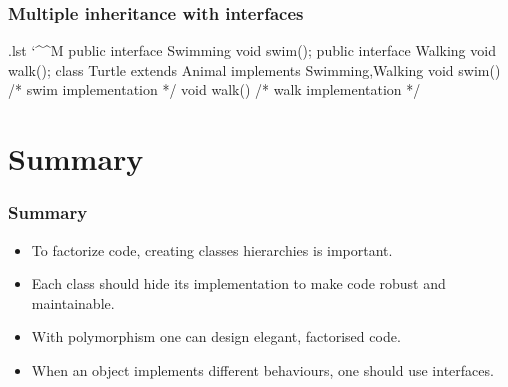 \documentclass[10pt,handout]{beamer}
\makeatletter
\newenvironment{code}{%
  \begingroup
  \@bsphack
  \immediate\openout\lstvrb@out\jobname.lst
  \let\do\@makeother\dospecials\catcode`\^^M\active
  \def\verbatim@processline{%
    \immediate\write\lstvrb@out{\the\verbatim@line}}%
  \verbatim@start}{%
  \immediate\closeout\lstvrb@out
  \@esphack
  \endgroup
  
  \begin{alertblock}{}
    
  \end{alertblock}}
\makeatother
\begin{document}
\begin{frame}[fragile]
  \frametitle{Multiple inheritance with interfaces}
  \begin{center}
  \end{center}
\end{frame}

\begin{frame}[fragile]
  \begin{code}
  public interface Swimming {
    void swim();
  }
  public interface Walking {
    void walk();
  }
  class Turtle extends Animal 
               implements Swimming,Walking{
    void swim() { /* swim implementation */}
    void walk() { /* walk implementation */}
  }
  \end{code}
\end{frame}

\section{Summary}
\begin{frame}
  \frametitle{Summary}
  
  \begin{itemize}
    \item To factorize code, creating classes hierarchies is
      important.
    \item Each class should hide its implementation to make code
      robust and maintainable.
    \item With polymorphism one can design elegant, factorised code.
    \item When an object implements different behaviours, one should
      use interfaces.
  \end{itemize}
\end{frame}
\end{document}
